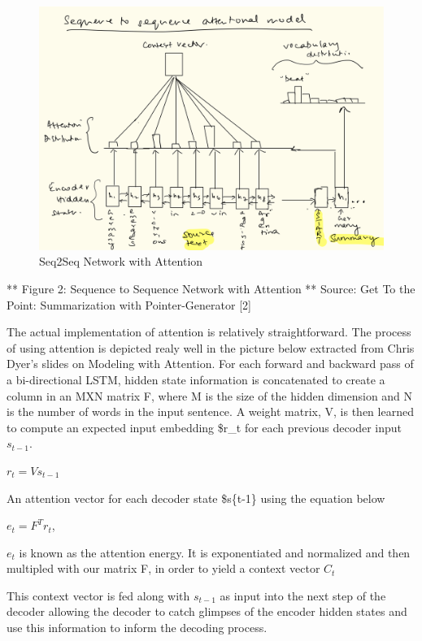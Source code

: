 \documentclass[11pt]{article}
\makeatletter
\def\maxwidth{\ifdim\Gin@nat@width>\linewidth\linewidth
    \else\Gin@nat@width\fi}
\let\Oldincludegraphics\includegraphics
\renewcommand{\includegraphics}[1]{\Oldincludegraphics[width=.8\maxwidth]{#1}}
\makeatother
\begin{document}
\begin{figure}
\centering
\includegraphics{seq2seq-attn.png}
\caption{Seq2Seq Network with Attention}
\end{figure}

 ** Figure 2: Sequence to Sequence Network with Attention ** Source: Get
To the Point: Summarization with Pointer-Generator {[}2{]} 

    The actual implementation of attention is relatively straightforward.
The process of using attention is depicted realy well in the picture
below extracted from Chris Dyer's slides on Modeling with Attention. For
each forward and backward pass of a bi-directional LSTM, hidden state
information is concatenated to create a column in an MXN matrix F, where
M is the size of the hidden dimension and N is the number of words in
the input sentence. A weight matrix, V, is then learned to compute an
expected input embedding \$r\_t for each previous decoder input
\(s_{t-1}\).

\(r_{t} = Vs_{t-1}\)

An attention vector for each decoder state \$s\{t-1\} using the equation
below

\(e_t = F^Tr_{t}\),

\(e_t\) is known as the attention energy. It is exponentiated and
normalized and then multipled with our matrix F, in order to yield a
context vector \(C_{t}\)

This context vector is fed along with \(s_{t-1}\) as input into the next
step of the decoder allowing the decoder to catch glimpses of the
encoder hidden states and use this information to inform the decoding
process.
\end{document}
